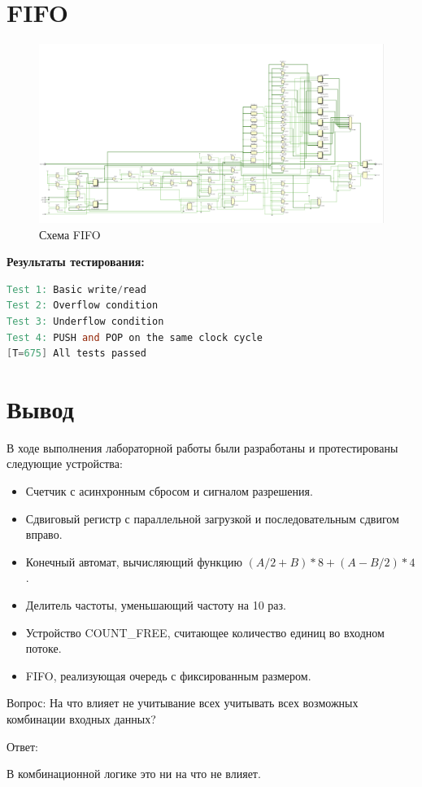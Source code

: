 \documentclass[12pt,onecolumn]{article}
\begin{document}
\section{FIFO}
\begin{figure}[H]
  \centering
  \includegraphics[width=\textwidth]{image/fifo.png}
  \caption{Схема FIFO}
\end{figure}
\textbf{Результаты тестирования:}
\begin{lstlisting}[language=verilog]
Test 1: Basic write/read
Test 2: Overflow condition
Test 3: Underflow condition
Test 4: PUSH and POP on the same clock cycle
[T=675] All tests passed
\end{lstlisting}


\section{Вывод}
В ходе выполнения лабораторной работы были разработаны и протестированы следующие устройства:
\begin{itemize}
  \item Счетчик с асинхронным сбросом и сигналом разрешения.
  \item Сдвиговый регистр с параллельной загрузкой и последовательным сдвигом вправо.
  \item Конечный автомат, вычисляющий функцию $(A/2+B)*8 + (A-B/2)*4$.
  \item Делитель частоты, уменьшающий частоту на 10 раз.
  \item Устройство COUNT\_FREE, считающее количество единиц во входном потоке.
  \item FIFO, реализующая очередь с фиксированным размером.
\end{itemize}
Вопрос: На что влияет не учитывание всех учитывать всех
возможных комбинации входных данных?

Ответ:

    В комбинационной логике это ни на что не влияет. 
\end{document}
